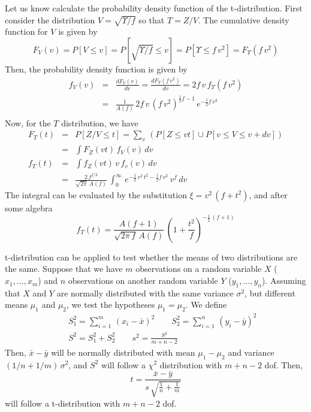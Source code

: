 \documentclass[aps,prl,preprint,superscriptaddress]{revtex4-1}
\begin{document}
Let us know calculate the probability density function of the t-distribution. 
First consider the distribution $V = \sqrt{\Upsilon/f}$ so
that $T = Z / V$. The cumulative density function for $V$ is given by
%
\begin{equation}
F_V(v) = P[ V \leq v] = P[ \sqrt{\Upsilon/f} \leq v ] = P[\Upsilon \leq f\, v^2] 
       = F_{\Upsilon}(f\, v^2)
\end{equation}
%
Then, the probability density function is given by
%
\begin{eqnarray}
f_V(v) &=& \frac{d F_V(v)}{d v} = \frac{d F_{\Upsilon}(f\, v^2)}{d v} = 2f\, v\, f_{\Upsilon}(f\, v^2) \nonumber\\
       &=& \frac{1}{A(f)}\, 2f\, v\, \left( f\, v^2 \right)^{\frac{1}{2}f-1}\, e^{-\frac{1}{2}f\, v^2} \nonumber\\
\end{eqnarray}
%
Now, for the $T$ distribution, we have
%
\begin{eqnarray}
F_{T}(t) &=& P[Z/V \leq t] = \sum_v\, \left( P[ Z \leq vt] \cup P[ v \leq V \leq v + dv] \right) \nonumber\\
         &=& \int F_Z(vt)\, f_V(v)\, dv \nonumber\\
f_T(t)   &=& \int f_Z(vt)\, v\, f_v(v)\, dv \nonumber\\
         &=& \frac{2\, f^{f/2}}{\sqrt{2\pi}\, A(f)}\, \int_0^{\infty}\, e^{-\frac{1}{2}\, v^2\, t^2 - \frac{1}{2}f\, v^2}\, 
                                                     v^f\, dv
\end{eqnarray}
%  
The integral can be evaluated by the substitution $\xi = v^2\, (f+t^2)$, and after some algebra
%
\begin{equation}
f_T(t) = \frac{A(f+1)}{\sqrt{2\pi\, f}\, A(f)}\, \left( 1 + \frac{t^2}{f} \right)^{-\frac{1}{2}\, (f+1)}
\end{equation}

t-distribution can be applied to test whether the means of two distributions are the same. Suppose that
we have $m$ observations on a random variable $X$ ($x_1, \dots, x_m$) and $n$ observations on another
random variable $Y$ ($y_1, \dots, y_n$). Assuming that $X$ and $Y$ are normally distributed with the same
variance $\sigma^2$, but different means $\mu_1$ and $\mu_2$, we test the hypotheses $\mu_1 = \mu_2$. 
We define 
%
\begin{eqnarray}
&& S_1^2 = \sum_{i=1}^m\, \left( x_i - \bar{x} \right)^2 \qquad 
S_2^2 = \sum_{i=1}^n\, \left( y_i - \bar{y} \right)^2 \nonumber\\
%
&& S^2 = S_1^2 + S_2^2 \qquad s^2 = \frac{S^2}{m+n-2}
\end{eqnarray}
%
Then, ${\bar x} - {\bar y}$ will be normally distributed with mean $\mu_1 - \mu_2$ and variance 
$(1/n + 1/m)\, \sigma^2$, and $S^2$ will follow a $\chi^2$ distribution with $m+n-2$ dof. Then,
%
\begin{equation}
t = \frac{ \bar{x} - \bar{y} }{s\, \sqrt{\frac{1}{n} + \frac{1}{m}} }
\end{equation}
%
will follow a t-distribution with $m+n-2$ dof.
\end{document}
